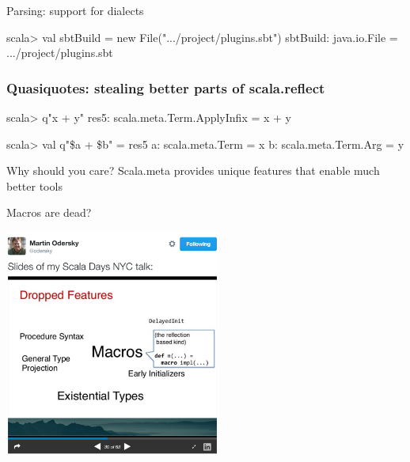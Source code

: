 \documentclass[svgnames,dvipsnames,hyperref={bookmarks=false},usepdftitle=false]{beamer}
\begin{document}
\begin{frame}[fragile]{Parsing: support for dialects}
\begin{semiverbatim}
scala> val sbtBuild = new File(".../project/plugins.sbt")
sbtBuild: java.io.File = .../project/plugins.sbt

\end{semiverbatim}
\end{frame}

\begin{frame}[fragile]
\frametitle<1>{Quasiquotes: stealing better parts of scala.reflect}
\begin{semiverbatim}
scala> q"x + y"
res5: scala.meta.Term.ApplyInfix = x + y

scala> val q"\$a + \$b" = res5
a: scala.meta.Term = x
b: scala.meta.Term.Arg = y
\end{semiverbatim}
\end{frame}


\begin{frame}{Why should you care?}
Scala.meta provides unique features that enable much better tools
\end{frame}


\begin{frame}{Macros are dead?}
\vskip20pt
\begin{center}
\includegraphics[height=7.5cm]{macros-are-dead.png}
\end{center}
\end{frame}
\end{document}
